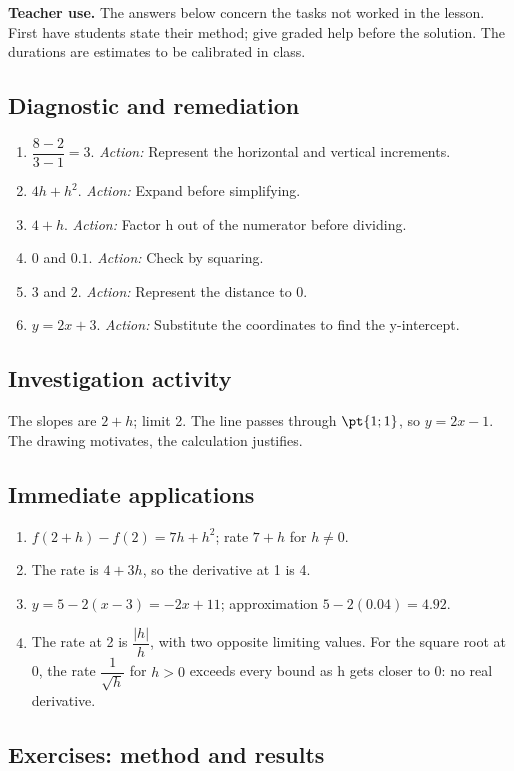 \label{C04-CORR}
\textbf{Teacher use.} The answers below concern the tasks not worked in the lesson. First have students state their method; give graded help before the solution. The durations are estimates to be calibrated in class.
\subsection*{Diagnostic and remediation}
\begin{enumerate}
\item $\dfrac{8-2}{3-1}=3$. \textit{Action:} Represent the horizontal and vertical increments.
\item $4h+h^2$. \textit{Action:} Expand before simplifying.
\item $4+h$. \textit{Action:} Factor h out of the numerator before dividing.
\item $0$ and $\num{0,1}$. \textit{Action:} Check by squaring.
\item $3$ and $2$. \textit{Action:} Represent the distance to 0.
\item $y=2x+3$. \textit{Action:} Substitute the coordinates to find the y-intercept.
\end{enumerate}
\subsection*{Investigation activity}
The slopes are $2+h$; limit 2. The line passes through $\pt{1;1}$, so $y=2x-1$. The drawing motivates, the calculation justifies.
\subsection*{Immediate applications}
\begin{enumerate}
\item $f(2+h)-f(2)=7h+h^2$; rate $7+h$ for $h\ne0$.
\item The rate is $4+3h$, so the derivative at 1 is 4.
\item $y=5-2(x-3)=-2x+11$; approximation $5-2(\num{0,04})=\num{4,92}$.
\item The rate at 2 is $\dfrac{|h|}{h}$, with two opposite limiting values. For the square root at 0, the rate $\dfrac{1}{\sqrt h}$ for $h>0$ exceeds every bound as h gets closer to 0: no real derivative.
\end{enumerate}
\subsection*{Exercises: method and results}
